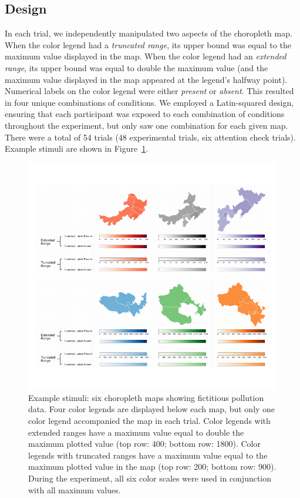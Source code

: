 \documentclass[
]{interact}
\begin{document}
\hypertarget{design}{%
\subsection{Design}\label{design}}

In each trial, we independently manipulated two aspects of the
choropleth map. When the color legend had a \emph{truncated range}, its
upper bound was equal to the maximum value displayed in the map. When
the color legend had an \emph{extended range}, its upper bound was equal
to double the maximum value (and the maximum value displayed in the map
appeared at the legend's halfway point). Numerical labels on the color
legend were either \emph{present} or \emph{absent}. This resulted in
four unique combinations of conditions. We employed a Latin-squared
design, ensuring that each participant was exposed to each combination
of conditions throughout the experiment, but only saw one combination
for each given map. There were a total of 54 trials (48 experimental
trials, six attention check trials). Example stimuli are shown in
Figure~\ref{fig-example-stimuli}.

\begin{figure}

{\centering \includegraphics{ChoroplethMagnitude_files/figure-pdf/fig-example-stimuli-1.pdf}

}

\caption{\label{fig-example-stimuli}Example stimuli: six choropleth maps
showing fictitious pollution data. Four color legends are displayed
below each map, but only one color legend accompanied the map in each
trial. Color legends with extended ranges have a maximum value equal to
double the maximum plotted value (top row: 400; bottom row: 1800). Color
legends with truncated ranges have a maximum value equal to the maximum
plotted value in the map (top row: 200; bottom row: 900). During the
experiment, all six color scales were used in conjunction with all
maximum values.}

\end{figure}
\end{document}
